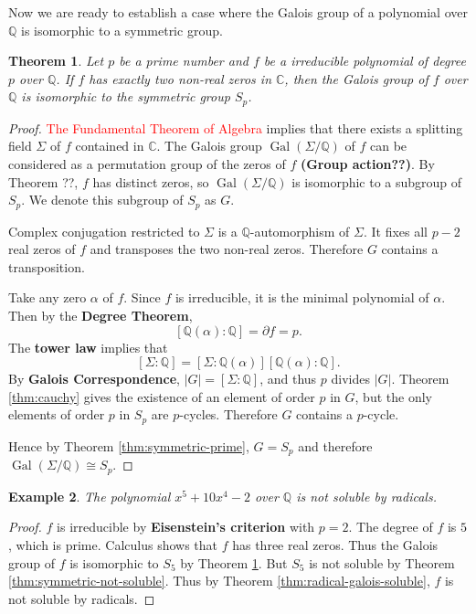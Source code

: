 \documentclass[12pt]{article}
\newtheorem{theorem}{Theorem}
\newtheorem{example}[theorem]{Example}
\newcommand{\Gal}{\operatorname{Gal}}
\begin{document}
Now we are ready to establish a case where the Galois group of a polynomial over $\mathbb Q$ is isomorphic to a symmetric group.

\begin{theorem} \label{thm:galois-iso-symmetric}
    Let $p$ be a prime number and $f$ be a irreducible polynomial of degree $p$ over $\mathbb Q$. If $f$ has exactly two non-real zeros in $\mathbb C$, then the Galois group of $f$ over $\mathbb Q$ is isomorphic to the symmetric group $S_p$.
\end{theorem}

\begin{proof}
    \textcolor{red}{The Fundamental Theorem of Algebra} implies that there exists a splitting field $\Sigma $ of $f$ contained in $\mathbb C$. The Galois group $\Gal(\Sigma / \mathbb Q)$ of $f$ can be considered as a permutation group of the zeros of $f$ \textbf{(Group action??)}. By Theorem ??, $f$ has distinct zeros, so $\Gal(\Sigma / \mathbb Q)$ is isomorphic to a subgroup of $S_p$. We denote this subgroup of $S_p$ as $G$. 

    Complex conjugation restricted to $\Sigma$ is a $\mathbb Q$-automorphism of $\Sigma$. It fixes all $p - 2$ real zeros of $f$ and transposes the two non-real zeros. Therefore $G$ contains a transposition. 

    Take any zero $\alpha$ of $f$. Since $f$ is irreducible, it is the minimal polynomial of $\alpha$. Then by the \textbf{Degree Theorem}, $$[\mathbb Q(\alpha) : \mathbb Q] = \partial f = p. $$ The \textbf{tower law} implies that $$[\Sigma : \mathbb Q] = [\Sigma : \mathbb Q(\alpha)] [ \mathbb Q(\alpha) : \mathbb Q]. $$ By \textbf{Galois Correspondence}, $|G| = [\Sigma : \mathbb Q]$, and thus $p$ divides $|G|$. Theorem \ref{thm:cauchy} gives the existence of an element of order $p$ in $G$, but the only elements of order $p$ in $S_p$ are $p$-cycles. Therefore $G$ contains a $p$-cycle.

    Hence by Theorem \ref{thm:symmetric-prime}, $ G = S_p$ and therefore $\Gal(\Sigma / \mathbb Q) \cong S_p$.
\end{proof}

\begin{example}
    The polynomial $x^5 + 10 x^4 - 2$ over $\mathbb Q$ is not soluble by radicals.
\end{example}

\begin{proof}
    $f$ is irreducible by \textbf{Eisenstein's criterion} with $p = 2$. The degree of $f$ is $5$, which is prime. Calculus shows that $f$ has three real zeros. Thus the Galois group of $f$ is isomorphic to $S_5$ by Theorem \ref{thm:galois-iso-symmetric}. But $S_5$ is not soluble by Theorem \ref{thm:symmetric-not-soluble}. Thus by Theorem \ref{thm:radical-galois-soluble}, $f$ is not soluble by radicals.
\end{proof}
\end{document}
